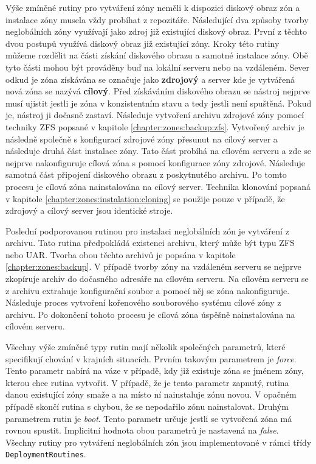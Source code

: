 Výše zmíněné rutiny pro vytváření zóny neměli k dispozici diskový obraz zón a instalace zóny musela vždy probíhat z repozitáře.
Následující dva způsoby tvorby neglobálních zóny využívají jako zdroj již existující diskový obraz. První z těchto dvou postupů
využívá diskový obraz již existující zóny. Kroky této rutiny můžeme rozdělit na části získání diskového obrazu a samotné instalace
zóny. Obě tyto části mohou být prováděny buď na lokální serveru nebo na vzdáleném. Sever odkud je zóna získávána se označuje
jako \textbf{zdrojový} a server kde je vytvářená nová zóna se nazývá \textbf{cílový}. Před získáváním diskového obrazu se 
nástroj nejprve musí ujistit jestli je zóna v konzistentním stavu a tedy jestli není spuštěná. Pokud je, nástroj ji dočasně zastaví.
Následuje vytvoření archivu zdrojové zóny pomocí techniky ZFS popsané v kapitole \ref{chapter:zones:backup:zfs}. Vytvořený archiv je
následně společně s konfigurací zdrojové zóny přesunut na cílový server a následuje druhá část instalace zóny. Tato část probíhá na
cílovém serveru a zde se nejprve nakonfiguruje cílová zóna s pomocí konfigurace zóny zdrojové. Následuje samotná část připojení
diskového obrazu z poskytnutého archivu. Po tomto procesu je cílová zóna nainstalována na cílový server. Technika klonování
popsaná v kapitole \ref{chapter:zones:instalation:cloning} se použije pouze v případě, že zdrojový a cílový server jsou 
identické stroje.

Poslední podporovanou rutinou pro instalaci neglobálních zón je vytváření z archivu. Tato rutina předpokládá existenci archivu,
který může být typu ZFS nebo UAR. Tvorba obou těchto archivů je popsána v kapitole \ref{chapter:zones:backup}. V případě tvorby
zóny na vzdáleném serveru se nejprve zkopíruje archiv do dočasného adresáře na cílovém serveru. Na cílovém serveru se z archivu
extrahuje konfigurační soubor a pomocí něj se zóna nakonfiguruje. Následuje proces vytvoření kořenového souborového systému cílové
zóny z archivu. Po dokončení tohoto procesu je cílová zóna úspěšně nainstalována na cílovém serveru.

Všechny výše zmíněné typy rutin mají několik společných parametrů, které specifikují chování v krajních situacích. Prvním
takovým parametrem je \textit{force}. Tento parametr nabírá na váze v případě, kdy již existuje zóna se jménem zóny, kterou
chce rutina vytvořit. V případě, že je tento parametr zapnutý, rutina danou existující zóny smaže a na místo ní nainstaluje
zónu novou. V opačném případě skončí rutina s chybou, že se nepodařilo zónu nainstalovat. Druhým parametrem rutin je \textit{boot}.
Tento parametr určuje jestli se vytvořená zóna má rovnou spustit. Implicitní hodnota obou parametrů je nastavená na \textit{false}.
Všechny rutiny pro vytváření neglobálních zón jsou implementované v rámci třídy \verb|DeploymentRoutines|.
